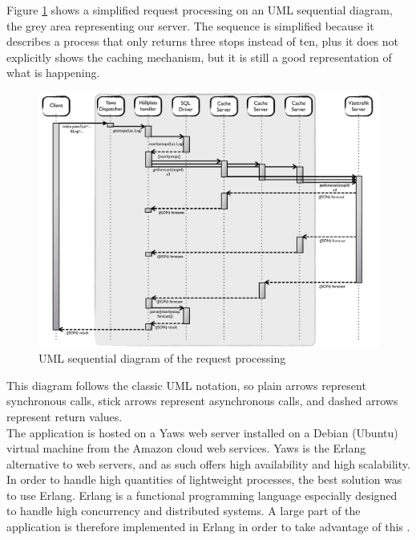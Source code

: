 Figure \ref{fig:message_passing} shows a simplified request processing on an UML sequential diagram, the grey area representing our server. The sequence is simplified because it describes a process that only returns three stops instead of ten, plus it does not explicitly shows the caching mechanism, but it is still a good representation of what is happening.\\
\clearpage
\begin{figure}[ht]
\center
\includegraphics[scale=0.4]{pics/message_passing}
\caption{UML sequential diagram of the request processing}
\label{fig:message_passing}
\end{figure}

This diagram follows the classic UML notation, so plain arrows represent synchronous calls, stick arrows represent asynchronous calls, and dashed arrows represent return values. \\

The application is hosted on a Yaws web server installed on a Debian (Ubuntu) virtual machine from the Amazon cloud web services. Yaws is the Erlang alternative to web servers, and as such offers high availability and high scalability.\\

In order to handle high quantities of lightweight processes, the best solution was to use Erlang. Erlang is a functional programming language especially designed to handle high concurrency and distributed systems.  A large part of the application is therefore implemented in Erlang in order to take advantage of this \label{sec:erlang_intro}.\\

